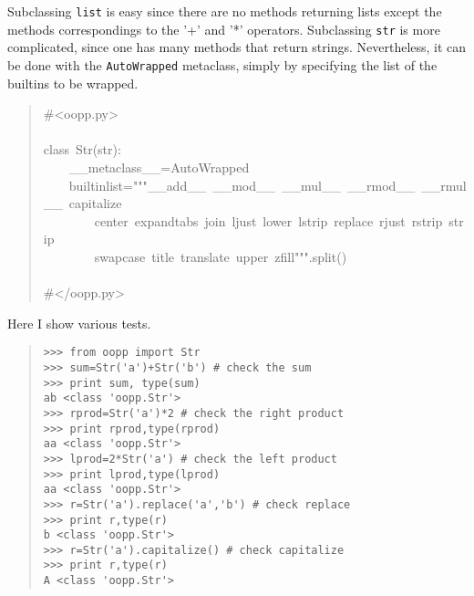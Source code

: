 \documentclass[10pt,english]{article}
\begin{document}
Subclassing \texttt{list} is easy since there are no methods returning lists
except the methods correspondings to the '+' and '*' operators. 
Subclassing \texttt{str} is more complicated, since one has many methods
that return strings. Nevertheless, it can be done with the \texttt{AutoWrapped}
metaclass, simply by specifying the list of the builtins to be wrapped.
\begin{quote}
\begin{ttfamily}\begin{flushleft}
\mbox{{\#}<oopp.py>}\\
\mbox{}\\
\mbox{class~Str(str):}\\
\mbox{~~~~{\_}{\_}metaclass{\_}{\_}=AutoWrapped}\\
\mbox{~~~~builtinlist="""{\_}{\_}add{\_}{\_}~{\_}{\_}mod{\_}{\_}~{\_}{\_}mul{\_}{\_}~{\_}{\_}rmod{\_}{\_}~{\_}{\_}rmul{\_}{\_}~capitalize}\\
\mbox{~~~~~~~~center~expandtabs~join~ljust~lower~lstrip~replace~rjust~rstrip~strip}\\
\mbox{~~~~~~~~swapcase~title~translate~upper~zfill""".split()}\\
\mbox{}\\
\mbox{{\#}</oopp.py>}
\end{flushleft}\end{ttfamily}
\end{quote}

Here I show various tests.
\begin{quote}
\begin{verbatim}>>> from oopp import Str
>>> sum=Str('a')+Str('b') # check the sum
>>> print sum, type(sum)
ab <class 'oopp.Str'>
>>> rprod=Str('a')*2 # check the right product 
>>> print rprod,type(rprod)
aa <class 'oopp.Str'>
>>> lprod=2*Str('a') # check the left product 
>>> print lprod,type(lprod)
aa <class 'oopp.Str'>
>>> r=Str('a').replace('a','b') # check replace
>>> print r,type(r)
b <class 'oopp.Str'>
>>> r=Str('a').capitalize() # check capitalize
>>> print r,type(r)
A <class 'oopp.Str'>\end{verbatim}
\end{quote}
\end{document}
